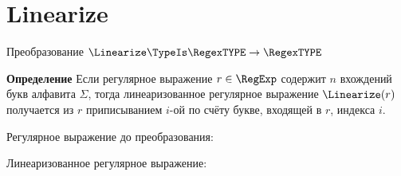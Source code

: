 \section{Linearize}
\begin{frame}{Преобразование $\Linearize\TypeIs\RegexTYPE\to\RegexTYPE$}
	\begin{block}{\bf Определение}
		Если регулярное выражение $r\in\RegExp$ содержит $n$ вхождений букв алфавита $\Sigma$, тогда линеаризованное регулярное выражение $\Linearize(r)$ получается из $r$ приписыванием $i$-ой по счёту букве, входящей в $r$, индекса $i$.
	\end{block} %
	
	Регулярное выражение до преобразования:

	Линеаризованное регулярное выражение:

\end{frame}
